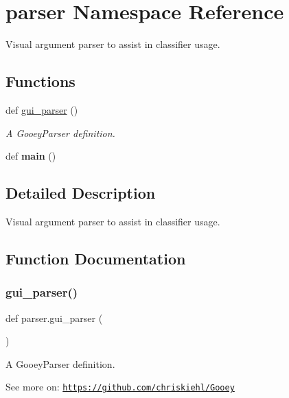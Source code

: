 \hypertarget{namespaceparser}{}\section{parser Namespace Reference}
\label{namespaceparser}


Visual argument parser to assist in classifier usage.  


\subsection*{Functions}
\begin{DoxyCompactItemize}
\item 
def \mbox{\hyperlink{namespaceparser_a585169ceb940c834569be9cb97315c4b}{gui\+\_\+parser}} ()
\begin{DoxyCompactList}\small\item\em A Gooey\+Parser definition. \end{DoxyCompactList}\item 
\mbox{\label{namespaceparser_a304715cbbb95022cbff25aed752d8847}} 
def {\bfseries main} ()
\end{DoxyCompactItemize}


\subsection{Detailed Description}
Visual argument parser to assist in classifier usage. 



\subsection{Function Documentation}
\mbox{\label{namespaceparser_a585169ceb940c834569be9cb97315c4b}} 
\subsubsection{\texorpdfstring{gui\+\_\+parser()}{gui\_parser()}}
{\footnotesize\ttfamily def parser.\+gui\+\_\+parser (\begin{DoxyParamCaption}{ }\end{DoxyParamCaption})}



A Gooey\+Parser definition. 

See more on\+: \href{https://github.com/chriskiehl/Gooey}{\tt https\+://github.\+com/chriskiehl/\+Gooey} 